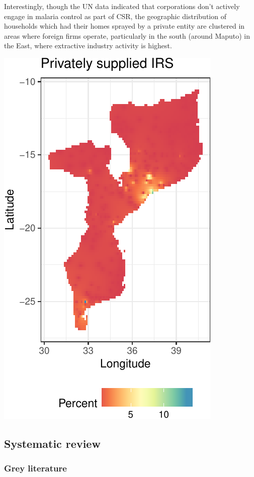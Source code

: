 \documentclass[]{elsarticle} %
\begin{document}
Interestingly, though the UN data indicated that corporations don't
actively engage in malaria control as part of CSR, the geographic
distribution of households which had their homes sprayed by a private
entity are clustered in areas where foreign firms operate, particularly
in the south (around Maputo) in the East, where extractive industry
activity is highest.

\begin{center}\includegraphics{paper_files/figure-latex/unnamed-chunk-12-1} \end{center}

\subsection{Systematic review}\label{systematic-review-1}

\subsubsection{Grey literature}\label{grey-literature-1}
\end{document}
